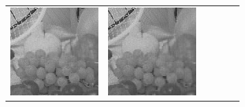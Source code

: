 \documentclass[11pt,a4paper,openright,oneside]{book}
\numberwithin{equation}{section}
\begin{document}
{\begin{figure}[h]
\begin{adjustwidth}{-3cm}{-3cm}
\begin{tabular}{>{\centering\arraybackslash}m{1.5cm} m{2.5cm} m{2.5cm} m{2.5cm} m{2.5cm} m{2.5cm}}
        \includegraphics[width=\linewidth]{media/tnale/AAAfruits-comp3-ale-12.png} & 
        \includegraphics[width=\linewidth]{media/tnale/AAAfruits-comp4-ale-12.png} &

\end{tabular}
\end{adjustwidth}
\end{figure}}
\end{document}
